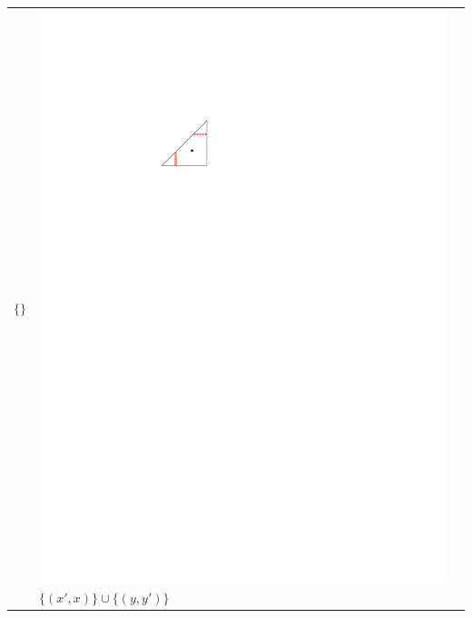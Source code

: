 \documentclass{patmorin}
\begin{document}
\begin{table}
\begin{center}
\begin{tabular}{m{1ex}|>{\centering\arraybackslash}m{}|>{\centering\arraybackslash}m{}}
           $\{\}$  
         & \includegraphics[scale=.9]{figs/killersb-1} \break%
           $\{(x',x)\} \cup \{(y,y')\}$ \\ 

\end{tabular}
\end{center}
\end{table}
\end{document}
